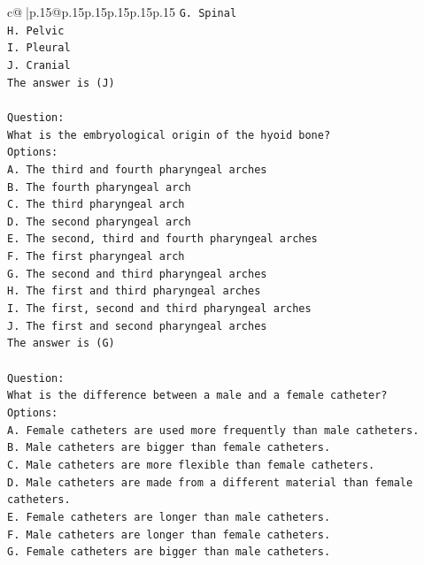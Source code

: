 \documentclass{article}
\begin{document}
{\begin{supertabular}{c@{$\;$}|p{.15\linewidth}@{}p{.15\linewidth}p{.15\linewidth}p{.15\linewidth}p{.15\linewidth}p{.15\linewidth}}
{{{\texttt{G. Spinal} \\
\texttt{H. Pelvic} \\
\texttt{I. Pleural} \\
\texttt{J. Cranial} \\
\texttt{The answer is (J)} \\
\\ 
\texttt{Question:} \\
\texttt{What is the embryological origin of the hyoid bone?} \\
\texttt{Options:} \\
\texttt{A. The third and fourth pharyngeal arches} \\
\texttt{B. The fourth pharyngeal arch} \\
\texttt{C. The third pharyngeal arch} \\
\texttt{D. The second pharyngeal arch} \\
\texttt{E. The second, third and fourth pharyngeal arches} \\
\texttt{F. The first pharyngeal arch} \\
\texttt{G. The second and third pharyngeal arches} \\
\texttt{H. The first and third pharyngeal arches} \\
\texttt{I. The first, second and third pharyngeal arches} \\
\texttt{J. The first and second pharyngeal arches} \\
\texttt{The answer is (G)} \\
\\ 
\texttt{Question:} \\
\texttt{What is the difference between a male and a female catheter?} \\
\texttt{Options:} \\
\texttt{A. Female catheters are used more frequently than male catheters.} \\
\texttt{B. Male catheters are bigger than female catheters.} \\
\texttt{C. Male catheters are more flexible than female catheters.} \\
\texttt{D. Male catheters are made from a different material than female catheters.} \\
\texttt{E. Female catheters are longer than male catheters.} \\
\texttt{F. Male catheters are longer than female catheters.} \\
\texttt{G. Female catheters are bigger than male catheters.} \\
}}}
\end{supertabular}}
\end{document}
